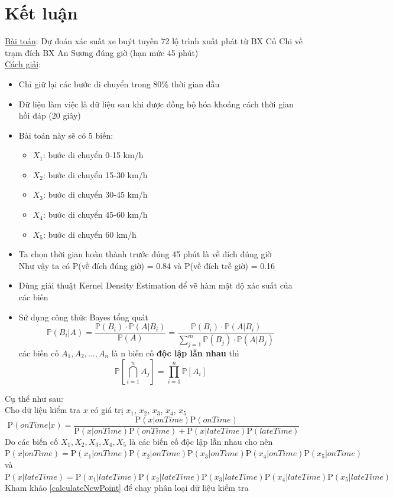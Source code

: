 \documentclass[a4paper, 13pt]{report}
\begin{document}
\section{Kết luận}
\underline{Bài toán}: Dự đoán xác suất xe buýt tuyến 72 lộ trình xuất phát từ BX Củ Chi về trạm đích BX An Sương đúng giờ (hạn mức 45 phút)\\
\underline{Cách giải}:
\begin{itemize}
\item Chỉ giữ lại các bước di chuyển trong 80\% thời gian đầu
\item Dữ liệu làm việc là dữ liệu sau khi được đồng bộ hóa khoảng cách thời gian hồi đáp (20 giây)
\item Bài toán này sẽ có 5 biến: 
\begin{itemize}
\item $X_1$: bước di chuyển 0-15 km/h
\item $X_2$: bước di chuyển 15-30 km/h
\item $X_3$: bước di chuyển 30-45 km/h
\item $X_4$: bước di chuyển 45-60 km/h
\item $X_5$: bước di chuyển 60 km/h
\end{itemize}
\item Ta chọn thời gian hoàn thành trước đúng 45 phút là về đích đúng giờ\\
Như vậy ta có $\mathrm{P}$(về đích đúng giờ) = 0.84 và $\mathrm{P}$(về đích trễ giờ) = 0.16
\item Dùng giải thuật Kernel Density Estimation để vẽ hàm mật độ xác suất của các biến
\item Sử dụng công thức Bayes tổng quát 
\[ %
  \mathbb{P}(B_{i}|A)= \dfrac{\mathbb{P}(B_{i})\cdot \mathbb{P}(A|B_{i})}{\mathbb{P}(A)}
            =\dfrac{\mathbb{P}(B_{i})\cdot \mathbb{P}(A|B_{i})}{\sum_{j=1}^{m} \mathbb{P}(B_j) \cdot \mathbb{P}(A|B_j)}
\]
các biến cố $A_{1}, A_{2},..., A_{n}$ là n biến cố \textbf{độc lập lẫn nhau} thì
\[
\mathbb{P}\left[\bigcap_{i=1}^n A_j \right] = \prod_{i=1}^n \mathbb{P}[A_i]
\]
\end{itemize}
Cụ thể như sau:\\
Cho dữ liệu kiểm tra $x$ có giá trị $x_1$, $x_2$, $x_3$, $x_4$, $x_5$\\
\[
\mathrm{P}(onTime|x) = \frac{\mathrm{P}(x|onTime)\mathrm{P}(onTime)}{\mathrm{P}(x|onTime)\mathrm{P}(onTime)+\mathrm{P}(x|lateTime)\mathrm{P}(lateTime)}
\]
Do các biến cố $X_1, X_2, X_3, X_4, X_5$ là các biến cố độc lập lẫn nhau cho nên\\
$\mathrm{P}(x|onTime) = \mathrm{P}(x_1|onTime)\mathrm{P}(x_2|onTime)\mathrm{P}(x_3|onTime)\mathrm{P}(x_4|onTime)\mathrm{P}(x_5|onTime)$ \\
và $\mathrm{P}(x|lateTime) = \mathrm{P}(x_1|lateTime)\mathrm{P}(x_2|lateTime)\mathrm{P}(x_3|lateTime)\mathrm{P}(x_4|lateTime)\mathrm{P}(x_5|lateTime)$
Kham khảo \ref{calculateNewPoint} để chạy phân loại dữ liệu kiểm tra\\
\end{document}
